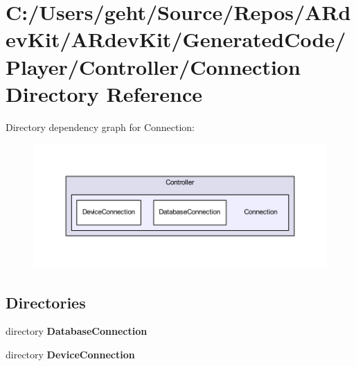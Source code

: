 \section{C\-:/\-Users/geht/\-Source/\-Repos/\-A\-Rdev\-Kit/\-A\-Rdev\-Kit/\-Generated\-Code/\-Player/\-Controller/\-Connection Directory Reference}
\label{dir_84847949b605322acdb63a8141f3555d}
Directory dependency graph for Connection\-:
\nopagebreak
\begin{figure}[H]
\begin{center}
\leavevmode
\includegraphics[width=350pt]{dir_84847949b605322acdb63a8141f3555d_dep}
\end{center}
\end{figure}
\subsection*{Directories}
\begin{DoxyCompactItemize}
\item 
directory {\bf Database\-Connection}
\item 
directory {\bf Device\-Connection}
\end{DoxyCompactItemize}
